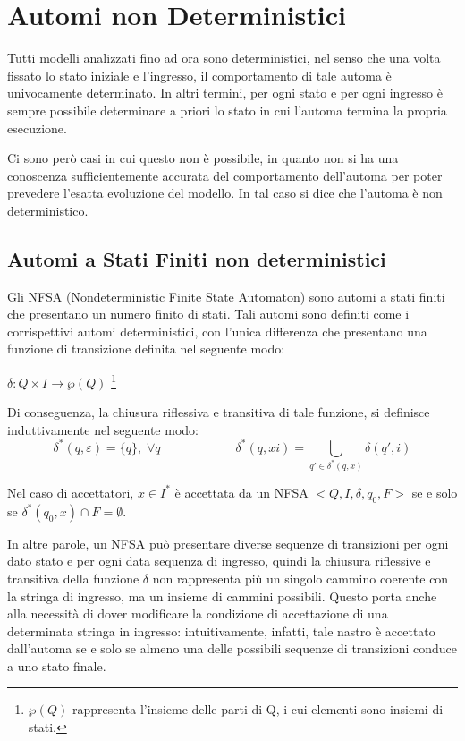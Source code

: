 \chapter{Automi non Deterministici}
  Tutti modelli analizzati fino ad ora sono deterministici, nel senso che una volta fissato lo stato iniziale e l'ingresso, il comportamento di tale automa è univocamente determinato. In altri termini, per ogni stato e per ogni ingresso è sempre possibile determinare a priori lo stato in cui l'automa termina la propria esecuzione.
  
  Ci sono però casi in cui questo non è possibile, in quanto non si ha una conoscenza sufficientemente accurata del comportamento dell'automa per poter prevedere l'esatta evoluzione del modello. In tal caso si dice che l'automa è non deterministico. 

  \section{Automi a Stati Finiti non deterministici}
  Gli NFSA (Nondeterministic Finite State Automaton) sono automi a stati finiti che presentano un numero finito di stati. Tali automi sono definiti come i corrispettivi automi deterministici, con l'unica differenza che presentano una funzione di transizione definita nel seguente modo:
  
  \(\delta:Q\times I\to \wp(Q)\) \footnote{\(\wp (Q)\) rappresenta l'insieme delle parti di Q, i cui elementi sono insiemi di stati.}

  Di conseguenza, la chiusura riflessiva e transitiva di tale funzione, si definisce induttivamente nel seguente modo:
  \begin{equation*}
    \delta^*(q,\varepsilon)=\{q\},\; \forall q \qquad\qquad\qquad \delta^*(q,xi)=\bigcup_{q'\in \delta^*(q,x)}\delta(q',i)
  \end{equation*}

  Nel caso di accettatori, \(x\in I^*\) è accettata da un NFSA \(<Q,I,\delta, q_0, F>\) se e solo se \(\delta^*(q_0,x)\cap F = \emptyset\).

  In altre parole, un NFSA può presentare diverse sequenze di transizioni per ogni dato stato e per ogni data sequenza di ingresso, quindi la chiusura riflessive e transitiva della funzione \(\delta\) non rappresenta più un singolo cammino coerente con la stringa di ingresso, ma un insieme di cammini possibili. Questo porta anche alla necessità di dover modificare la condizione di accettazione di una determinata stringa in ingresso: intuitivamente, infatti, tale nastro è accettato dall'automa se e solo se almeno una delle possibili sequenze di transizioni conduce a uno stato finale. 

